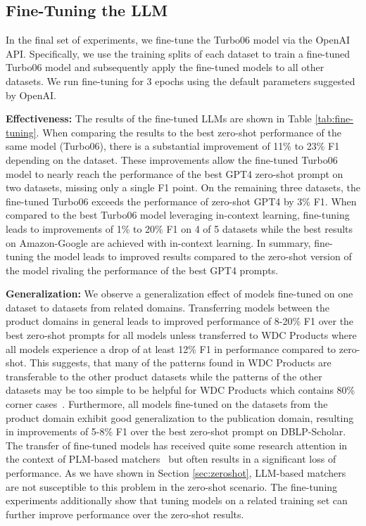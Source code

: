 \documentclass[sigconf,nonacm]{acmart}
\begin{document}
\subsection{Fine-Tuning the LLM}
\label{subsec:finetune}

In the final set of experiments, we fine-tune the Turbo06 model via the OpenAI API. Specifically, we use the training splits of each dataset to train a fine-tuned Turbo06 model and subsequently apply the fine-tuned models to all other datasets. We run fine-tuning for 3 epochs using the default parameters suggested by OpenAI.

\textbf{Effectiveness:} The results of the fine-tuned LLMs are shown in Table \ref{tab:fine-tuning}. When comparing the results to the best zero-shot performance of the same model (Turbo06), there is a substantial improvement of 11\% to 23\% F1 depending on the dataset. These improvements allow the fine-tuned Turbo06 model to nearly reach the performance of the best GPT4 zero-shot prompt on two datasets, missing only a single F1 point. On the remaining three datasets, the fine-tuned Turbo06 exceeds the performance of zero-shot GPT4 by 3\% F1. When compared to the best Turbo06 model leveraging in-context learning, fine-tuning leads to improvements of 1\% to 20\% F1 on 4 of 5 datasets while the best results on Amazon-Google are achieved with in-context learning. In summary, fine-tuning the model leads to improved results compared to the zero-shot version of the model rivaling the performance of the best GPT4 prompts. 

\textbf{Generalization:} We observe a generalization effect of models fine-tuned on one dataset to datasets from related domains. Transferring models between the product domains in general leads to improved performance of 8-20\% F1 over the best zero-shot prompts for all models unless transferred to WDC Products where all models experience a drop of at least 12\% F1 in performance compared to zero-shot. This suggests, that many of the patterns found in WDC Products are transferable to the other product datasets while the patterns of the other datasets may be too simple to be helpful for WDC Products which contains 80\% corner cases~\cite{peeters2023wdc}. Furthermore, all models fine-tuned on the datasets from the product domain exhibit good generalization to the publication domain, resulting in improvements of 5-8\% F1 over the best zero-shot prompt on DBLP-Scholar. The transfer of fine-tuned models has received quite some research attention in the context of PLM-based matchers~\cite{trabelsiDAMEDomainAdaptation2022,tuDomainAdaptationDeep2022} but often results in a significant loss of performance. As we have shown in Section \ref{sec:zeroshot}, LLM-based matchers are not susceptible to this problem in the zero-shot scenario. The fine-tuning experiments additionally show that tuning models on a related training set can further improve performance over the zero-shot results.
\end{document}
